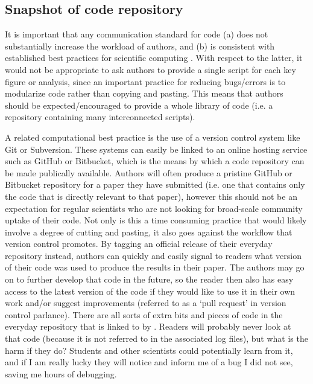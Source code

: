 \subsection{Snapshot of code repository}\label{s:snapshot}

It is important that any communication standard for code (a) does not substantially increase the workload of authors, and (b) is consistent with established best practices for scientific computing \citep{Wilson2014a}. With respect to the latter, it would not be appropriate to ask authors to provide a single script for each key figure or analysis, since an important practice for reducing bugs/errors is to modularize code rather than copying and pasting. This means that authors should be expected/encouraged to provide a whole library of code (i.e. a repository containing many interconnected scripts).

A related computational best practice is the use of a version control system like Git or Subversion. These systems can easily be linked to an online hosting service such as GitHub or Bitbucket, which is the means by which a code repository can be made publically available. Authors will often produce a pristine GitHub or Bitbucket repository for a paper they have submitted (i.e. one that contains only the code that is directly relevant to that paper), however this should not be an expectation for regular scientists who are not looking for broad-scale community uptake of their code. Not only is this a time consuming practice that would likely involve a degree of cutting and pasting, it also goes against the workflow that version control promotes. By tagging an official release of their everyday repository instead, authors can quickly and easily signal to readers what version of their code was used to produce the results in their paper. The authors may go on to further develop that code in the future, so the reader then also has easy access to the latest version of the code if they would like to use it in their own work and/or suggest improvements (referred to as a `pull request' in version control parlance). There are all sorts of extra bits and pieces of code in the everyday repository that is linked to by \citet{Irving2015}. Readers will probably never look at that code (because it is not referred to in the associated log files), but what is the harm if they do? Students and other scientists could potentially learn from it, and if I am really lucky they will notice and inform me of a bug I did not see, saving me hours of debugging.       

